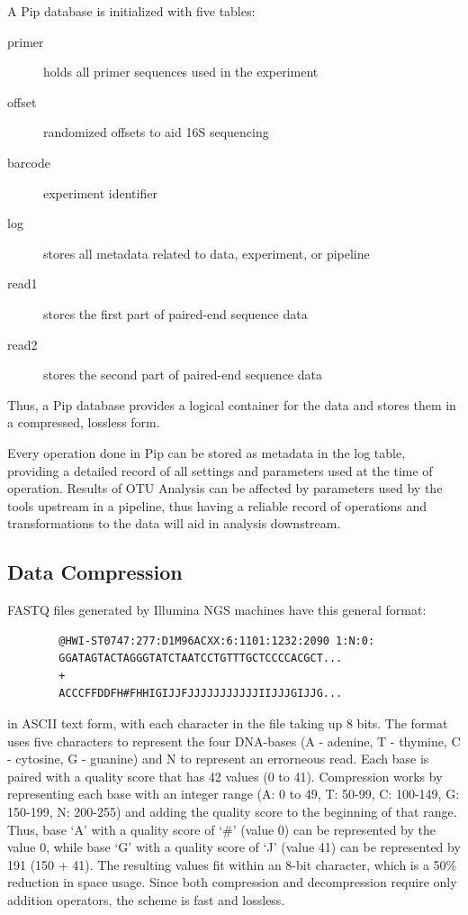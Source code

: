 \documentclass[12pt]{article}
\begin{document}
	A Pip database is initialized with five tables:
	
	\begin{description}
		\item[primer] holds all primer sequences used in the experiment
		\item[offset] randomized offsets to aid 16S sequencing
		\item[barcode] experiment identifier
		\item[log] stores all metadata related to data, experiment, or pipeline
		\item[read1] stores the first part of paired-end sequence data
		\item[read2] stores the second part of paired-end sequence data
	\end{description}
	
	Thus, a Pip database provides a logical container for the data and stores them
	in a compressed, lossless form.
	
	Every operation done in Pip can be stored as metadata in the log table, providing a
	detailed record of all settings and parameters used at the time of operation. 
	Results of OTU Analysis can be affected by parameters used by the tools upstream
	in a pipeline, thus having a reliable record of operations and transformations
	to the data will aid in analysis downstream.


	\subsection{Data Compression} %
	\label{sub:data_compression}
	FASTQ files generated by Illumina NGS machines have this general format:
	\begin{verbatim}
		@HWI-ST0747:277:D1M96ACXX:6:1101:1232:2090 1:N:0:
		GGATAGTACTAGGGTATCTAATCCTGTTTGCTCCCCACGCT...
		+
		ACCCFFDDFH#FHHIGIJJFJJJJJJJJJJJIIJJJGIJJG...
	\end{verbatim}
	
	in ASCII text form, with each character in the file taking up 8 bits. The format
	uses five characters to represent the four DNA-bases (A - adenine, T - thymine,
	C - cytosine, G - guanine) and N to represent an errorneous read. Each base is paired
	with a quality score that has 42 values (0 to 41). Compression works by representing
	each base with an integer range (A: 0 to 49, T: 50-99, C: 100-149, G: 150-199, N: 200-255)
	and adding the quality score to the beginning of that range. Thus, base `A' with a 
	quality score of `\#' (value 0) can be represented by the value 0, while base `G' with
	a quality score of `J' (value 41) can be represented by 191 (150 + 41). The resulting
	values fit within an 8-bit character, which is a 50\% reduction in space usage. 
	Since both compression and decompression require only addition operators, the scheme
	is fast and lossless.
\end{document}
